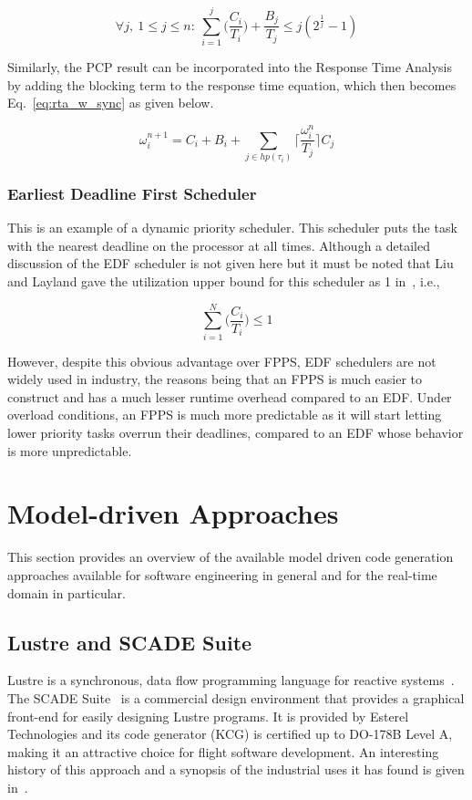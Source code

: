 \begin{equation}
\label{eq:rma_w_sync}
\forall j,\ 1 \le j \le n:\ \sum_{i=1}^j
\bigg(\frac{C_i}{T_i}\bigg)+\frac{B_j}{T_j} \le j(2^{\frac{1}{j}}-1)
\end{equation}

Similarly, the PCP result can be incorporated into the Response Time
Analysis by adding the blocking term to the response time equation,
which then becomes Eq.~\ref{eq:rta_w_sync} as given below.

\begin{equation}
\label{eq:rta_w_sync}
\omega_i^{n+1}=C_i + B_i + \sum_{j \in hp(\tau_i)}
\bigg\lceil\frac{\omega_i^n}{T_j}\bigg\rceil C_j
\end{equation}

\subsubsection{Earliest Deadline First Scheduler}
This is an example of a dynamic priority scheduler. This scheduler
puts the task with the nearest deadline on the processor at all
times. Although a detailed discussion of the EDF scheduler is not
given here but it must be noted that Liu and Layland gave the
utilization upper bound for this scheduler as 1 in~\cite{liu@jacm73},
i.e.,

\begin{displaymath}
\sum_{i=1}^N \bigg(\frac{C_i}{T_i}\bigg) \le 1
\end{displaymath}

However, despite this obvious advantage over FPPS, EDF schedulers are
not widely used in industry, the reasons being that an FPPS is much
easier to construct and has a much lesser runtime overhead compared to
an EDF. Under overload conditions, an FPPS is much more predictable as
it will start letting lower priority tasks overrun their deadlines,
compared to an EDF whose behavior is more unpredictable.

\section{Model-driven Approaches}
This section provides an overview of the available model driven code
generation approaches available for software engineering in general
and for the real-time domain in particular.

\subsection{Lustre and SCADE Suite}
Lustre is a synchronous, data flow programming language for reactive
systems~\cite{halbwachs@popl87, halbwachs@ieee91}. The SCADE
Suite~\cite{caspi@sigplan03} is a commercial design environment that
provides a graphical front-end for easily designing Lustre
programs. It is provided by Esterel Technologies and its code
generator (KCG) is certified up to DO-178B Level A, making it an
attractive choice for flight software development. An interesting
history of this approach and a synopsis of the industrial uses it has
found is given in~\cite{halbwachs@memocode05, halbwachs@ieee03}.


